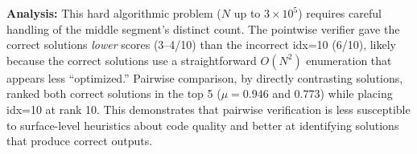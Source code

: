 \noindent\textbf{Analysis:} This hard algorithmic problem ($N$ up to $3\times10^5$) requires careful handling of the middle segment's distinct count. The pointwise verifier gave the correct solutions \emph{lower} scores (3--4/10) than the incorrect idx=10 (6/10), likely because the correct solutions use a straightforward $O(N^2)$ enumeration that appears less ``optimized.'' Pairwise comparison, by directly contrasting solutions, ranked both correct solutions in the top 5 ($\mu = 0.946$ and $0.773$) while placing idx=10 at rank 10. This demonstrates that pairwise verification is less susceptible to surface-level heuristics about code quality and better at identifying solutions that produce correct outputs.
